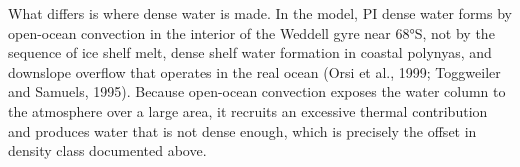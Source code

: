 What differs is where dense water is made. In the model, PI dense water forms by open-ocean convection in the interior of the Weddell gyre near 68°S, not by the sequence of ice shelf melt, dense shelf water formation in coastal polynyas, and downslope overflow that operates in the real ocean (Orsi et al., 1999; Toggweiler and Samuels, 1995). Because open-ocean convection exposes the water column to the atmosphere over a large area, it recruits an excessive thermal contribution and produces water that is not dense enough, which is precisely the offset in density class documented above.